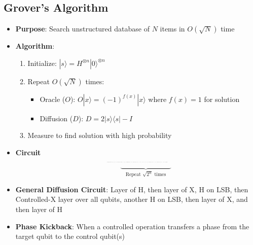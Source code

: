 \begin{multicols}{3}
    \section*{Grover's Algorithm}
    \begin{itemize}[leftmargin=*,nosep,topsep=0pt]
      \item \textbf{Purpose}: Search unstructured database of $N$ items in
        $O(\sqrt{N})$ time
      \item \textbf{Algorithm}:
        \begin{enumerate}[nosep]
          \item Initialize: $|s\rangle = H^{\otimes n}|0\rangle^{\otimes n}$
          \item Repeat $O(\sqrt{N})$ times:
            \begin{itemize}[nosep]
              \item Oracle ($O$): $O|x\rangle = (-1)^{f(x)}|x\rangle$ where
                $f(x)=1$ for solution
              \item Diffusion ($D$): $D = 2|s\rangle\langle s| - I$
            \end{itemize}
          \item Measure to find solution with high probability
        \end{enumerate}


      \item \textbf{Circuit}
        \[
          \resizebox{0.25\textwidth}{!}{
            \begin{quantikz}
              \lstick{$q_{n-1}$} & \gate{H} & \gate[5]{\shortstack{$f(x)$ \\ Oracle}} & \qw & \gate[5]{\text{Diffusion Circuit}} & \meter{} \\
              \lstick{$q_{n-2}$} & \gate{H} & & & & \meter{} \\
              \vdots & \vdots & & \vdots & & \vdots \\
              \lstick{$q_1$} & \gate{H} & & & & \meter{} \\
              \lstick{$q_0$} & \gate{H} & & & & \meter{}
            \end{quantikz}
          }
        \]
        \[
          \hspace{1cm}
          \underbrace{\hspace{3cm}}_{\text{Repeat } \sqrt{2^n} \text{ times}}
        \]
      \item \textbf{General Diffusion Circuit}: Layer of H, then layer of X,
        H on LSB, then Controlled-X layer over all qubits, another H on LSB,
        then layer of X, and then layer of H
      \item \textbf{Phase Kickback}: When a controlled operation transfers a
        phase from the target qubit to the control qubit(s)
    \end{itemize}


\end{multicols}
